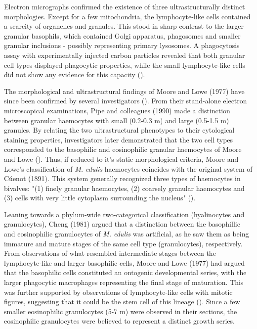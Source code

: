Electron micrographs confirmed the existence of three ultrastructurally distinct morphologies. Except for a few mitochondria, the lymphocyte-like cells contained a scarcity of organelles and granules. This stood in sharp contrast to the larger granular basophils, which contained Golgi apparatus, phagosomes and smaller granular inclusions - possibly representing primary lysosomes. A phagocytosis assay with experimentally injected carbon particles revealed that both granular cell types displayed phagocytic properties, while the small lymphocyte-like cells did not show any evidence for this capacity (\cite{Moore1977}).

The morphological and ultrastructural findings of Moore and Lowe (1977) have since been confirmed by several investigators (\cite{Rasmussen1985, Renwartz1990, Pipe1990, Noel1994, Pipe1997, Wootton2003}). From their stand-alone electron microscopical examinations, Pipe and colleagues (1990) made a distinction between granular haemocytes with small (0.2-0.3 \micro m) and large (0.5-1.5 \micro m) granules. By relating the two ultrastructural phenotypes to their cytological staining properties, investigators later demonstrated that the two cell types corresponded to the basophilic and eosinophilic granular haemocytes of Moore and Lowe (\cite{Pipe1990, Noel1994}). Thus, if reduced to it's static morphological criteria, Moore and Lowe's classification of \emph{M. edulis} haemocytes coincides with the original system of Cúenot (1891). This system generally recognized three types of haemocytes in bivalves: "(1) finely granular haemocytes, (2) coarsely granular haemocytes and (3) cells with very little cytoplasm surrounding the nucleus" (\cite{Cheng1984}). 

Leaning towards a phylum-wide two-categorical classification (hyalinocytes and granulocytes), Cheng (1981) argued that a distinction between the basophillic and eosinophilic granulocytes of \emph{M. edulis} was artificial, as he saw them as being immature and mature stages of the same cell type (granulocytes), respectively. From observations of what resembled intermediate stages between the lymphocyte-like and larger basophilic cells, Moore and Lowe (1977) had argued that the basophilic cells constituted an ontogenic developmental series, with the larger phagocytic macrophages representing the final stage of maturation. This was further supported by observations of lymphocyte-like cells with mitotic figures, suggesting that it could be the stem cell of this lineage (\cite{Moore1977}). Since a few smaller eosinophilic granulocytes (5-7 \micro m) were observed in their sections, the eosinophilic granulocytes were believed to represent a distinct growth series.

